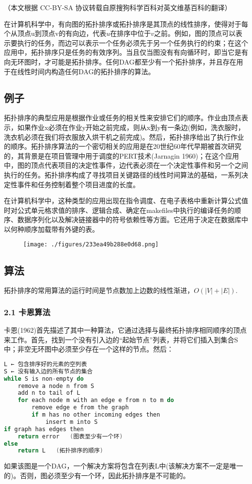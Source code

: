 
（本文根据 CC-BY-SA 协议转载自原搜狗科学百科对英文维基百科的翻译）

在计算机科学中，有向图的拓扑排序或拓扑排序是其顶点的线性排序，使得对于每个从顶点u到顶点v的有向边，代表$u$在排序中位于$v$之前。例如，图的顶点可以表示要执行的任务，而边可以表示一个任务必须先于另一个任务执行的约束；在这个应用中，拓扑排序只是任务的有效序列。当且仅当图没有有向循环时，即当它是有向无环图时，才可能是拓扑排序。任何DAG都至少有一个拓扑排序，并且存在用于在线性时间内构造任何DAG的拓扑排序的算法。

\subsection{例子}
拓扑排序的典型应用是根据作业或任务的相关性来安排它们的顺序。作业由顶点表示，如果作业x必须在作业y开始之前完成，则从x到y有一条边(例如，洗衣服时，洗衣机必须在我们将衣服放入烘干机之前完成)。然后，拓扑排序给出了执行作业的顺序。拓扑排序算法的一个密切相关的应用是在20世纪60年代早期被首次研究的，其背景是在项目管理中用于调度的PERT技术(Jarnagin 1960)；在这个应用中，图的顶点代表项目的决定性事件，边代表必须在一个决定性事件和另一个之间执行的任务。拓扑排序构成了寻找项目关键路径的线性时间算法的基础，一系列决定性事件和任务控制着整个项目进度的长度。

在计算机科学中，这种类型的应用出现在指令调度、在电子表格中重新计算公式值时对公式单元格求值的排序、逻辑合成、确定在makefiles中执行的编译任务的顺序、数据序列化以及解决链接器中的符号依赖性等方面。它还用于决定在数据库中以何种顺序加载带有外键的表。
\begin{figure}[ht]
\centering
\texttt{[image: ./figures/233ea49b288e0d68.png]}
\caption\label{fig_TPPX_1}
\end{figure}

\subsection{算法}
拓扑排序的常用算法的运行时间是节点数加上边数的线性渐进，$O(|V|+|E|)$.
\subsubsection{2.1 卡恩算法}
卡恩(1962)首先描述了其中一种算法，它通过选择与最终拓扑排序相同顺序的顶点来工作。首先，找到一个没有引入边的“起始节点”列表，并将它们插入到集合S中；非空无环图中必须至少存在一个这样的节点。然后：
\begin{lstlisting}[language=cpp]
L ← 包含排序好的元素的空列表
S ← 没有输入边的所有节点的集合
while S is non-empty do
    remove a node n from S
    add n to tail of L
    for each node m with an edge e from n to m do
        remove edge e from the graph
        if m has no other incoming edges then
            insert m into S
if graph has edges then
    return error   (图表至少有一个环)
else 
    return L   (拓扑排序的顺序)
\end{lstlisting}
如果该图是一个DAG，一个解决方案将包含在列表L中(该解决方案不一定是唯一的)。否则，图必须至少有一个环，因此拓扑排序是不可能的。

